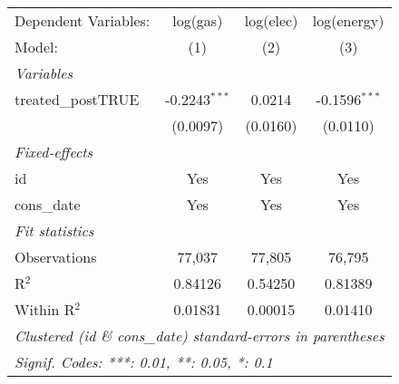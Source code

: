 
\begin{tabular}{lccc}
   \tabularnewline\midrule\midrule
   Dependent Variables: & log(gas)        & log(elec) & log(energy)\\
   Model:               & (1)             & (2)       & (3)\\
   \midrule \emph{Variables} &   &   &  \\
   treated\_postTRUE   & -0.2243$^{***}$ & 0.0214    & -0.1596$^{***}$\\
                        & (0.0097)        & (0.0160)  & (0.0110)\\
   \midrule \emph{Fixed-effects} &   &   &  \\
   id                   & Yes             & Yes       & Yes\\
   cons\_date          & Yes             & Yes       & Yes\\
   \midrule \emph{Fit statistics} &   &   &  \\
   Observations         & 77,037          & 77,805    & 76,795\\
   R$^2$                & 0.84126         & 0.54250   & 0.81389\\
   Within R$^2$         & 0.01831         & 0.00015   & 0.01410\\
   \midrule\midrule\multicolumn{4}{l}{\emph{Clustered (id \& cons\_date) standard-errors in parentheses}}\\
   \multicolumn{4}{l}{\emph{Signif. Codes: ***: 0.01, **: 0.05, *: 0.1}}\\
\end{tabular}


